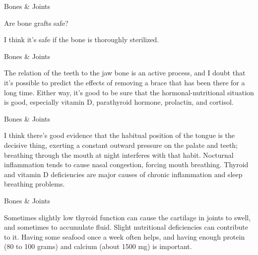\documentclass[11pt,oneside,openany,extrafontsizes]{memoir}
\begin{document}
\begin{qaexchange}{Bones \& Joints}

    \begin{question}
        Are bone grafts safe?
    \end{question}

    \begin{answer}
      I think it's safe if the bone is thoroughly sterilized.
    \end{answer}
\end{qaexchange}

\begin{standalonequote}{Bones \& Joints}

    \begin{answer}
       The relation of the teeth to the jaw bone is an active process, and I doubt that it's possible to predict the effects of removing a brace that has been there for a long time. Either way, it's good to be sure that the hormonal-nutritional situation is good, especially vitamin D, parathyroid hormone, prolactin, and cortisol. 
    \end{answer}
\end{standalonequote}

\begin{standalonequote}{Bones \& Joints}

    \begin{answer}
       I think there's good evidence that the habitual position of the tongue is the decisive thing, exerting a constant outward pressure on the palate and teeth; breathing through the mouth at night interferes with that habit. Nocturnal inflammation tends to cause nasal congestion, forcing mouth breathing. Thyroid and vitamin D deficiencies are major causes of chronic inflammation and sleep breathing problems. 
    \end{answer}
\end{standalonequote}

\begin{standalonequote}{Bones \& Joints}

    \begin{answer}
      Sometimes slightly low thyroid function can cause the cartilage in joints to swell, and sometimes to accumulate fluid. Slight nutritional deficiencies can contribute to it. Having some seafood once a week often helps, and having enough protein (80 to 100 grams) and calcium (about 1500 mg) is important.
    \end{answer}
\end{standalonequote}
\end{document}
